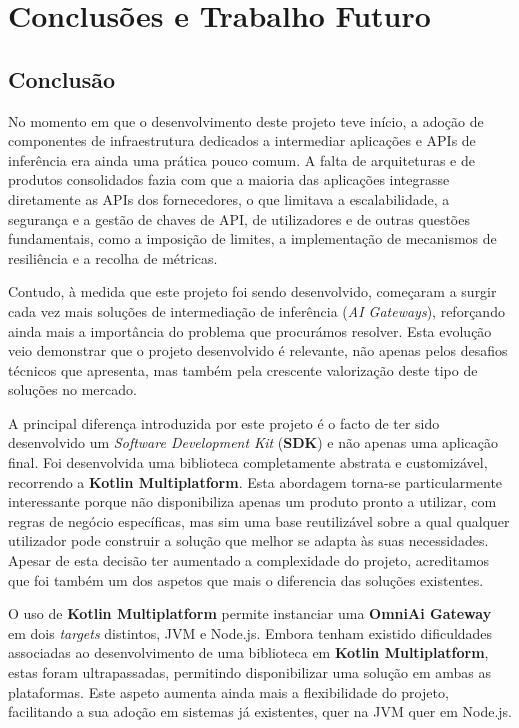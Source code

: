     \chapter{Conclusões e Trabalho Futuro}

    \section{Conclusão}

    No momento em que o desenvolvimento deste projeto teve início, a adoção de componentes de infraestrutura dedicados a intermediar aplicações e APIs de inferência era ainda uma prática pouco comum. A falta de arquiteturas e de produtos consolidados fazia com que a maioria das aplicações integrasse diretamente as APIs dos fornecedores, o que limitava a escalabilidade, a segurança e a gestão de chaves de API, de utilizadores e de outras questões fundamentais, como a imposição de limites, a implementação de mecanismos de resiliência e a recolha de métricas.

    Contudo, à medida que este projeto foi sendo desenvolvido, começaram a surgir cada vez mais soluções de intermediação de inferência (\textit{AI Gateways}), reforçando ainda mais a importância do problema que procurámos resolver. Esta evolução veio demonstrar que o projeto desenvolvido é relevante, não apenas pelos desafios técnicos que apresenta, mas também pela crescente valorização deste tipo de soluções no mercado.

    A principal diferença introduzida por este projeto é o facto de ter sido desenvolvido um \textit{Software Development Kit} (\textbf{SDK}) e não apenas uma aplicação final. Foi desenvolvida uma biblioteca completamente abstrata e customizável, recorrendo a \textbf{Kotlin Multiplatform}. Esta abordagem torna-se particularmente interessante porque não disponibiliza apenas um produto pronto a utilizar, com regras de negócio específicas, mas sim uma base reutilizável sobre a qual qualquer utilizador pode construir a solução que melhor se adapta às suas necessidades. Apesar de esta decisão ter aumentado a complexidade do projeto, acreditamos que foi também um dos aspetos que mais o diferencia das soluções existentes.

    O uso de \textbf{Kotlin Multiplatform} permite instanciar uma \textbf{OmniAi Gateway} em dois \textit{targets} distintos, JVM e Node.js. Embora tenham existido dificuldades associadas ao desenvolvimento de uma biblioteca em \textbf{Kotlin Multiplatform}, estas foram ultrapassadas, permitindo disponibilizar uma solução em ambas as plataformas. Este aspeto aumenta ainda mais a flexibilidade do projeto, facilitando a sua adoção em sistemas já existentes, quer na JVM quer em Node.js.

